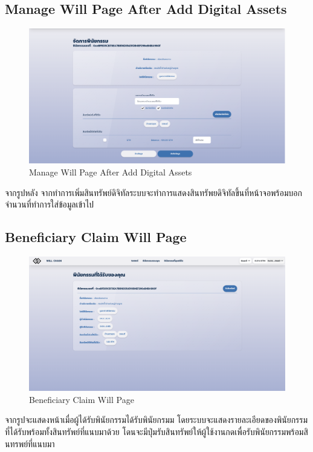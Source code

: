 \documentclass[12pt,oneside,openright,a4paper]{cpe-thai-project}
\begin{document}
\subsection{Manage Will Page After Add Digital Assets }
	\begin{figure}[!thb]
			\centering
			\includegraphics[scale=0.2]{manageWillFullAsset4}
			\caption{Manage Will Page After Add Digital Assets }
		\end{figure}
		\FloatBarrier
\tab จากรูปหลัง จากทำการเพิ่มสินทรัพย์ดิจิทัลระบบจะทำการแสดงสินทรัพยดิจิทัลขึ้นที่หน้าจอพร้อมบอกจำนวนที่ทำการใส่ข้อมูลเข้าไป

\subsection{Beneficiary Claim Will Page }
	\begin{figure}[!thb]
			\centering
			\includegraphics[scale=0.2]{claimWillBefore4}
			\caption{Beneficiary Claim Will Page }
		\end{figure}
		\FloatBarrier
\tab จากรูปจะแสดงหน้าเมื่อผู้ได้รับพินัยกรรมได้รับพินัยกรมม โดยระบบจะแสดงรายละเอียดของพินัยกรรมที่ได้รับพร้อมทั้งสินทรัพย์ที่แนบมาด้วย โดนจะมีปุ่มรับสินทรัพย์ให้ผู้ใช้งานกดเพื่อรับพินัยกรรมพร้อมสินทรพย์ที่แนบมา
\end{document}
